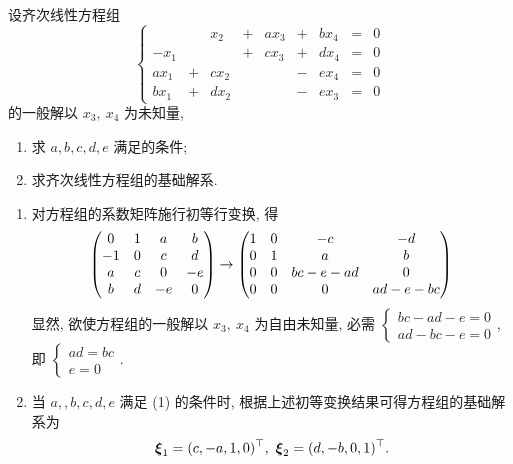 \begin{example}[2005 南开大学]
    设齐次线性方程组 $$\left\{\begin{matrix}
                 &   & x_2  & + & ax_3 & + & bx_4 & = & 0 \\
            -x_1 &   &      & + & cx_3 & + & dx_4 & = & 0 \\
            ax_1 & + & cx_2 &   &      & - & ex_4 & = & 0 \\
            bx_1 & + & dx_2 &   &      & - & ex_3 & = & 0
        \end{matrix}\right.$$
    的一般解以 $x_3,~x_4$ 为未知量, 
    \begin{enumerate}[label=(\arabic{*})]
        \item 求 $a,b,c,d,e$ 满足的条件;
        \item 求齐次线性方程组的基础解系.
    \end{enumerate}
\end{example}
\begin{solution}
    \begin{enumerate}[label=(\arabic{*})]
        \item 对方程组的系数矩阵施行初等行变换, 得 $$\mqty(0&1&a&b\\-1&0&c&d\\a&c&0&-e\\b&d&-e&0)\to\mqty(1&0&-c&-d\\0&1&a&b\\0&0&bc-e-ad&0\\0&0&0&ad-e-bc)$$
              显然, 欲使方程组的一般解以 $x_3,~x_4$ 为自由未知量, 必需 $\begin{cases}
                      bc-ad-e=0 \\
                      ad-bc-e=0
                  \end{cases}$, 即 $\begin{cases}
                      ad=bc \\e=0
                  \end{cases}$.
        \item 当 $a,,b,c,d,e$ 满足 (1) 的条件时, 根据上述初等变换结果可得方程组的基础解系为
              $$\vb*{\xi}_1=(c,-a,1,0)^\top,~\vb*{\xi}_2=(d,-b,0,1)^\top.$$
    \end{enumerate}
\end{solution}

